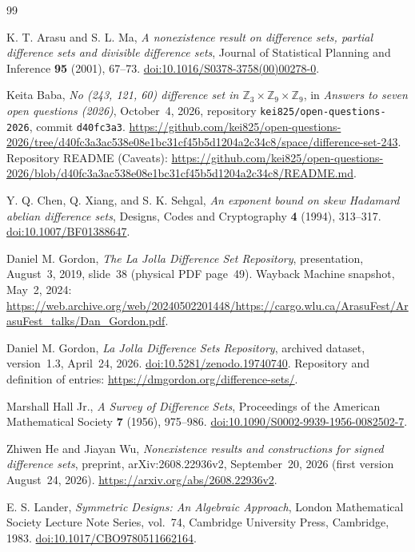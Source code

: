 \documentclass[11pt]{article}
\begin{document}
\begin{thebibliography}{99}

K. T. Arasu and S. L. Ma,
\emph{A nonexistence result on difference sets, partial difference sets
and divisible difference sets},
Journal of Statistical Planning and Inference \textbf{95} (2001), 67--73.
\href{https://doi.org/10.1016/S0378-3758(00)00278-0}{doi:10.1016/S0378-3758(00)00278-0}.

Keita Baba,
\emph{No (243, 121, 60) difference set in $\mathbb Z_3\times\mathbb Z_9\times\mathbb Z_9$},
in \emph{Answers to seven open questions (2026)}, October~4, 2026,
repository \texttt{kei825/open-questions-2026}, commit \texttt{d40fc3a3}.
\url{https://github.com/kei825/open-questions-2026/tree/d40fc3a3ac538e08e1bc31cf45b5d1204a2c34c8/space/difference-set-243}.
Repository README (Caveats):
\url{https://github.com/kei825/open-questions-2026/blob/d40fc3a3ac538e08e1bc31cf45b5d1204a2c34c8/README.md}.

Y. Q. Chen, Q. Xiang, and S. K. Sehgal,
\emph{An exponent bound on skew Hadamard abelian difference sets},
Designs, Codes and Cryptography \textbf{4} (1994), 313--317.
\href{https://doi.org/10.1007/BF01388647}{doi:10.1007/BF01388647}.

Daniel M. Gordon,
\emph{The La Jolla Difference Set Repository},
presentation, August~3, 2019, slide~38
(physical PDF page~49).
Wayback Machine snapshot, May~2, 2024:
\url{https://web.archive.org/web/20240502201448/https://cargo.wlu.ca/ArasuFest/ArasuFest_talks/Dan_Gordon.pdf}.

Daniel M. Gordon,
\emph{La Jolla Difference Sets Repository},
archived dataset, version~1.3, April~24, 2026.
\href{https://doi.org/10.5281/zenodo.19740740}{doi:10.5281/zenodo.19740740}.
Repository and definition of entries:
\url{https://dmgordon.org/difference-sets/}.

Marshall Hall Jr.,
\emph{A Survey of Difference Sets},
Proceedings of the American Mathematical Society
\textbf{7} (1956), 975--986.
\href{https://doi.org/10.1090/S0002-9939-1956-0082502-7}{doi:10.1090/S0002-9939-1956-0082502-7}.

Zhiwen He and Jiayan Wu,
\emph{Nonexistence results and constructions for signed difference sets},
preprint, arXiv:2608.22936v2, September~20, 2026
(first version August~24, 2026).
\url{https://arxiv.org/abs/2608.22936v2}.

E. S. Lander,
\emph{Symmetric Designs: An Algebraic Approach},
London Mathematical Society Lecture Note Series, vol.~74,
Cambridge University Press, Cambridge, 1983.
\href{https://doi.org/10.1017/CBO9780511662164}{doi:10.1017/CBO9780511662164}.


\end{thebibliography}
\end{document}
